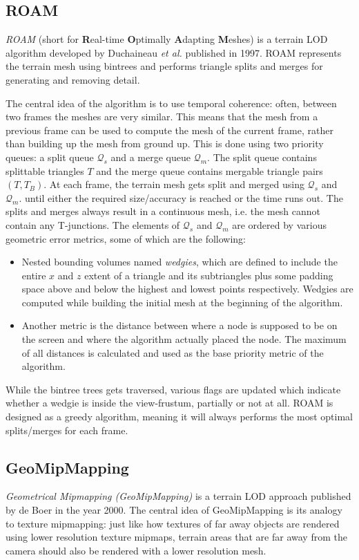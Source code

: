 \subsection{ROAM}
\textit{ROAM} (short for \textbf{R}eal-time \textbf{O}ptimally \textbf{A}dapting \textbf{M}eshes) 
is a terrain LOD algorithm developed by Duchaineau \textit{et al.} \cite{roam} published in 1997.
ROAM represents the terrain mesh using bintrees and performs triangle splits and merges
for generating and removing detail.

The central idea of the algorithm is to use temporal coherence: often, between two frames 
the meshes are very similar. This means that the mesh from a previous frame can be used to compute 
the mesh of the current frame, rather than building up the mesh from ground up.
This is done using two priority queues: a split queue $\mathcal{Q}_s$ and a merge queue $\mathcal{Q}_m$.
The split queue contains splittable triangles $T$
and the merge queue contains mergable triangle pairs $(T,T_B)$.
At each frame, the terrain mesh gets split and merged using $\mathcal{Q}_s$ and $\mathcal{Q}_m$. until either the required size/accuracy is reached
or the time runs out. 
The splits and merges always result in a continuous mesh, i.e. the mesh cannot contain any 
T-junctions.
The elements of $\mathcal{Q}_s$ and $\mathcal{Q}_m$ are ordered by 
various geometric error metrics, some of which are the following:
\begin{itemize}
  \item Nested bounding volumes named \textit{wedgies}, which are defined to include the entire $x$ and $z$ extent of a triangle and its subtriangles 
        plus some padding space above and below the highest and lowest points respectively. Wedgies are computed while building the initial mesh at the beginning of the algorithm.
  \item Another metric is the distance between where a node is supposed to be on the screen and where the algorithm actually placed the node.
        The maximum of all distances is calculated and used as the base priority metric of the algorithm.
\end{itemize}

While the bintree trees gets traversed, various flags are updated which indicate whether a wedgie is inside the view-frustum, partially or not at all.
ROAM is designed as a greedy algorithm, meaning it will always performs the most optimal splits/merges for each frame.


\subsection{GeoMipMapping}
\textit{Geometrical Mipmapping (GeoMipMapping)} is a terrain LOD approach published by de Boer \cite{geomipmapping} in the year 2000.
The central idea of GeoMipMapping is its analogy to texture mipmapping: just like how textures of far away objects are rendered using lower resolution texture mipmaps,
terrain areas that are far away from the camera should also be rendered with a lower resolution mesh.

